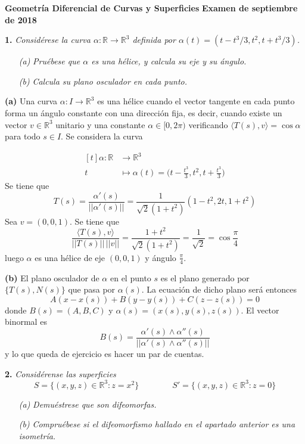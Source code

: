 \documentclass[12pt]{report}
\newcommand{\R}{\mathbb R}
\begin{document}
\small

\textbf{Geometría Diferencial de Curvas y Superficies} \hfill \textbf{Examen de septiembre de 2018}
\linebreak

\noindent \textbf{1. } \textit{Considérese la curva $\alpha \colon \R \to \R^3$ definida por $\alpha(t) = (t-t^3/3,t^2,t+t^3/3)$.}
\begin{itemize}
    \item[\textit{(a)}] \textit{Pruébese que $\alpha$ es una hélice, y calcula su eje y su ángulo.}
    \item[\textit{(b)}] \textit{Calcula su plano osculador en cada punto.}
\end{itemize}


\vspace{2mm}
\noindent \textbf{(a)} Una curva $\alpha \colon I \to \R^3$ es una hélice cuando el vector tangente en cada punto forma un ángulo constante con una dirección fija, es decir, cuando existe un vector $v \in \R^3$ unitario y una constante $\alpha \in [0,2\pi)$ verificando $\langle T(s), v \rangle = \cos \alpha$ para todo $s \in I$. Se considera la curva

\[
\begin{aligned}[t]
\alpha \colon \R &\longrightarrow \R^3 \\
t &\longmapsto \alpha(t) = \biggl(t-\frac{t^3}{3},t^2,t+\frac{t^3}{3}\biggr)
\end{aligned}
\]
Se tiene que
\[T(s) = \frac{\alpha'(s)}{||\alpha'(s)||} = \frac{1}{\sqrt{2}(1+t^2)}( 1-t^2,2t, 1+t^2)\]
Sea $v = (0,0,1)$. Se tiene que
\[\frac{\langle T(s), v \rangle}{||T(s)|| \, ||v||} = \frac{1+t^2}{\sqrt{2}(1+t^2)} = \frac{1}{\sqrt{2}} = \cos \frac{\pi}{4}\]
luego $\alpha$ es una hélice de eje $(0,0,1)$ y ángulo $\frac{\pi}{4}$.

\vspace{2mm}
\noindent \textbf{(b)} El plano osculador de $\alpha$ en el punto $s$ es el plano generado por $\{T(s),N(s)\}$ que pasa por $\alpha(s)$. La ecuación de dicho plano será entonces
\[A(x-x(s))+B(y-y(s))+C(z-z(s)) = 0\]
donde $B(s) = (A,B,C)$ y $\alpha(s) = (x(s),y(s),z(s))$. El vector binormal es
\[B(s) = \frac{\alpha'(s) \wedge \alpha''(s)}{||\alpha'(s) \wedge \alpha''(s)||}\]
y lo que queda de ejercicio es hacer un par de cuentas.

\vspace{4mm}
\noindent \textbf{2.} \textit{Considérense las superficies
\[S = \{(x,y,z) \in \R^3 \colon z = x^2\} \qquad \qquad S' = \{(x,y,z) \in \R^3 \colon z = 0\}\]}
\begin{itemize}
    \item[\textit{(a)}] \textit{Demuéstrese que son difeomorfas.}
    \item[\textit{(b)}] \textit{Compruébese si el difeomorfismo hallado en el apartado anterior es una isometría.}
\end{itemize}
\end{document}
